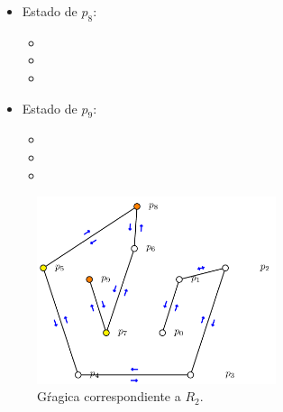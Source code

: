 \begin{multicols}{2}
\begin{itemize}
\begin{itemize}
      \item {}
      
      \item {}
      \end{itemize}

\item Estado de $p_8$:
      \begin{itemize}
      \item {}
      
      \item {}
      
      \item {}
      \end{itemize}

\item Estado de $p_9$:
      \begin{itemize}
      \item {}
      
      \item {}
      
      \item {}
      \end{itemize}

\end{itemize}
\end{multicols} 
\newpage

\begin{figure}[ht]
        \begin{center}
                \includegraphics[width=7cm]{RD2.png}
                \caption{Gŕagica correspondiente a $R_2$.}
        \end{center}
\end{figure}

